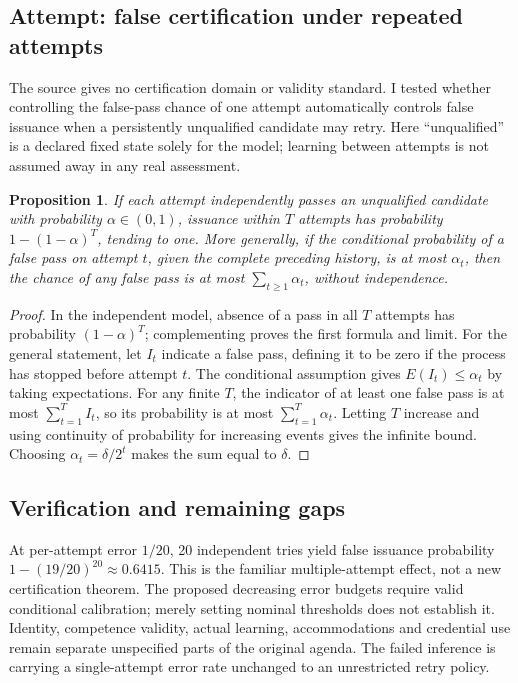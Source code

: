 \documentclass[11pt]{article}
\newtheorem{proposition}{Proposition}
\begin{document}
\subsection{Attempt: false certification under repeated attempts}
The source gives no certification domain or validity standard. I tested whether controlling the false-pass chance of one attempt automatically controls false issuance when a persistently unqualified candidate may retry. Here ``unqualified'' is a declared fixed state solely for the model; learning between attempts is not assumed away in any real assessment.
\begin{proposition}
If each attempt independently passes an unqualified candidate with probability $\alpha\in(0,1)$, issuance within $T$ attempts has probability $1-(1-\alpha)^T$, tending to one. More generally, if the conditional probability of a false pass on attempt $t$, given the complete preceding history, is at most $\alpha_t$, then the chance of any false pass is at most $\sum_{t\ge1}\alpha_t$, without independence.
\end{proposition}
\begin{proof}
In the independent model, absence of a pass in all $T$ attempts has probability $(1-\alpha)^T$; complementing proves the first formula and limit. For the general statement, let $I_t$ indicate a false pass, defining it to be zero if the process has stopped before attempt $t$. The conditional assumption gives $E(I_t)\le\alpha_t$ by taking expectations. For any finite $T$, the indicator of at least one false pass is at most $\sum_{t=1}^TI_t$, so its probability is at most $\sum_{t=1}^T\alpha_t$. Letting $T$ increase and using continuity of probability for increasing events gives the infinite bound. Choosing $\alpha_t=\delta/2^t$ makes the sum equal to $\delta$.
\end{proof}
\subsection{Verification and remaining gaps}
At per-attempt error $1/20$, 20 independent tries yield false issuance probability $1-(19/20)^{20}\approx0.6415$. This is the familiar multiple-attempt effect, not a new certification theorem. The proposed decreasing error budgets require valid conditional calibration; merely setting nominal thresholds does not establish it. Identity, competence validity, actual learning, accommodations and credential use remain separate unspecified parts of the original agenda. The failed inference is carrying a single-attempt error rate unchanged to an unrestricted retry policy.
\end{document}
